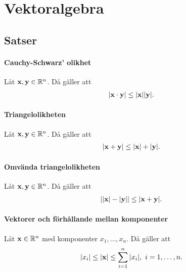 \section{Vektoralgebra}

\subsection{Satser}

\paragraph{Cauchy-Schwarz' olikhet}
Låt $\vect{x},\vect{y}\in\R^n$. Då gäller att
\begin{align*}
	\abs{\vect{x}\cdot\vect{y}}\leq\abs{\vect{x}}\abs{\vect{y}}.
\end{align*}

\proof

\paragraph{Triangelolikheten}
Låt $\vect{x},\vect{y}\in\R^n$. Då gäller att
\begin{align*}
	\abs{\vect{x} + \vect{y}}\leq\abs{\vect{x}} + \abs{\vect{y}}.
\end{align*}

\proof

\paragraph{Omvända triangelolikheten}
Låt $\vect{x},\vect{y}\in\R^n$. Då gäller att
\begin{align*}
	\abs{\abs{\vect{x}} - \abs{\vect{y}}}\leq\abs{\vect{x} + \vect{y}}.
\end{align*}

\proof

\paragraph{Vektorer och förhållande mellan komponenter}
Låt $\vect{x}\in\R^n$ med komponenter $x_1, \dots, x_n$. Då gäller att
\begin{align*}
	\abs{x_i}\leq\abs{\vect{x}}\leq\sum\limits_{i = 1}^{n}\abs{x_i},\ i = 1, \dots, n.
\end{align*}

\proof